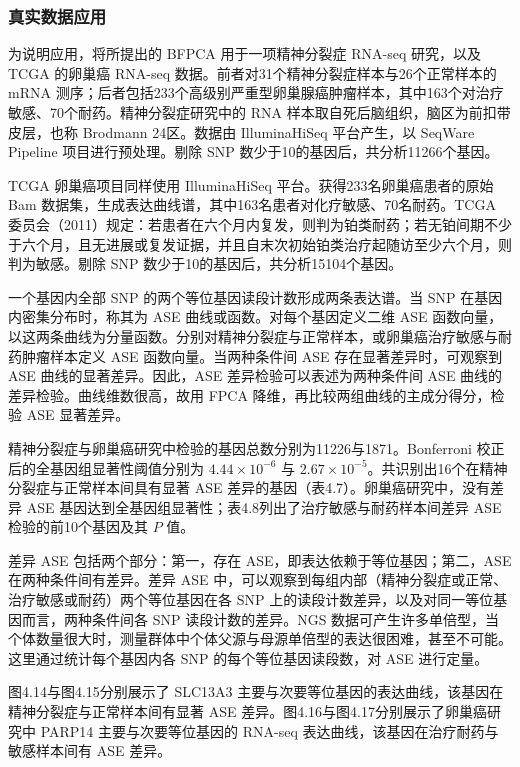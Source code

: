 \subsubsection{真实数据应用}
为说明应用，将所提出的 BFPCA 用于一项精神分裂症 RNA-seq 研究，以及 TCGA 的卵巢癌 RNA-seq 数据。前者对31个精神分裂症样本与26个正常样本的 mRNA 测序；后者包括233个高级别严重型卵巢腺癌肿瘤样本，其中163个对治疗敏感、70个耐药。精神分裂症研究中的 RNA 样本取自死后脑组织，脑区为前扣带皮层，也称 Brodmann 24区。数据由 IlluminaHiSeq 平台产生，以 SeqWare Pipeline 项目进行预处理。剔除 SNP 数少于10的基因后，共分析11266个基因。

TCGA 卵巢癌项目同样使用 IlluminaHiSeq 平台。获得233名卵巢癌患者的原始 Bam 数据集，生成表达曲线谱，其中163名患者对化疗敏感、70名耐药。TCGA 委员会（2011）规定：若患者在六个月内复发，则判为铂类耐药；若无铂间期不少于六个月，且无进展或复发证据，并且自末次初始铂类治疗起随访至少六个月，则判为敏感。剔除 SNP 数少于10的基因后，共分析15104个基因。

一个基因内全部 SNP 的两个等位基因读段计数形成两条表达谱。当 SNP 在基因内密集分布时，称其为 ASE 曲线或函数。对每个基因定义二维 ASE 函数向量，以这两条曲线为分量函数。分别对精神分裂症与正常样本，或卵巢癌治疗敏感与耐药肿瘤样本定义 ASE 函数向量。当两种条件间 ASE 存在显著差异时，可观察到 ASE 曲线的显著差异。因此，ASE 差异检验可以表述为两种条件间 ASE 曲线的差异检验。曲线维数很高，故用 FPCA 降维，再比较两组曲线的主成分得分，检验 ASE 显著差异。

精神分裂症与卵巢癌研究中检验的基因总数分别为11226与1871。Bonferroni 校正后的全基因组显著性阈值分别为 $4.44\times10^{-6}$ 与 $2.67\times10^{-5}$。共识别出16个在精神分裂症与正常样本间具有显著 ASE 差异的基因（表4.7）。卵巢癌研究中，没有差异 ASE 基因达到全基因组显著性；表4.8列出了治疗敏感与耐药样本间差异 ASE 检验的前10个基因及其 $P$ 值。



差异 ASE 包括两个部分：第一，存在 ASE，即表达依赖于等位基因；第二，ASE 在两种条件间有差异。差异 ASE 中，可以观察到每组内部（精神分裂症或正常、治疗敏感或耐药）两个等位基因在各 SNP 上的读段计数差异，以及对同一等位基因而言，两种条件间各 SNP 读段计数的差异。NGS 数据可产生许多单倍型，当个体数量很大时，测量群体中个体父源与母源单倍型的表达很困难，甚至不可能。这里通过统计每个基因内各 SNP 的每个等位基因读段数，对 ASE 进行定量。

图4.14与图4.15分别展示了 SLC13A3 主要与次要等位基因的表达曲线，该基因在精神分裂症与正常样本间有显著 ASE 差异。图4.16与图4.17分别展示了卵巢癌研究中 PARP14 主要与次要等位基因的 RNA-seq 表达曲线，该基因在治疗耐药与敏感样本间有 ASE 差异。





